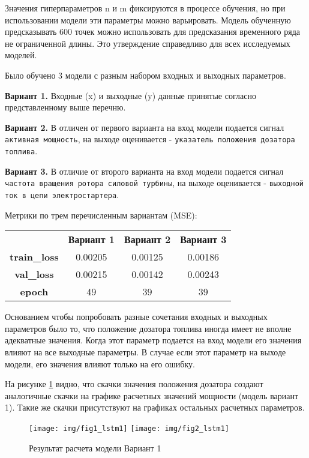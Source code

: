 \documentclass[12pt,a4paper]{article}
\begin{document}
Значения гиперпараметров n и m фиксируются в процессе обучения, но при использовании модели эти параметры можно варьировать. Модель обученную предсказывать 600 точек можно использовать для предсказания временного ряда не ограниченной длины. Это утверждение справедливо для всех исследуемых моделей.

Было обучено 3 модели с разным набором входных и выходных параметров.

{\bf Вариант 1.} Входные (x) и выходные (y) данные принятые согласно представленному выше перечню.

{\bf Вариант 2.} В отличен от первого варианта на вход модели подается сигнал \texttt{активная мощность}, на выходе оценивается - \texttt{указатель положения дозатора топлива}.

{\bf Вариант 3.} В отличие от второго варианта на вход модели подается сигнал \texttt{частота вращения ротора силовой турбины}, на выходе оценивается - \texttt{выходной ток в цепи электростартера}.

Метрики по трем перечисленным вариантам (MSE):

\begin{center}
\begin{tabular}{ |c|c|c|c| } 
	\hline
	 & {\bf Вариант 1} & {\bf Вариант 2} & {\bf Вариант 3} \\ 
	{\bf train\_loss} & 0.00205 & 0.00125 & 0.00186 \\ 
	{\bf val\_loss} & 0.00215 & 0.00142 & 0.00243 \\
	{\bf epoch} & 49 & 39 & 39 \\ 
	\hline
\end{tabular}
\end{center}

Основанием чтобы попробовать разные сочетания входных и выходных параметров было то, что положение дозатора топлива иногда имеет не вполне адекватные значения. Когда этот параметр подается на вход модели его значения влияют на все выходные параметры. В случае если этот параметр на выходе модели, его значения влияют только на его ошибку.

На рисунке \ref{fig:res_lstm1} видно, что скачки значения положения дозатора создают аналогичные скачки на графике расчетных значений мощности (модель вариант 1). Такие же скачки присутствуют на графиках остальных расчетных параметров.

\begin{figure}[htb]
	\centering\texttt{[image: img/fig1\_lstm1]}
	\centering\texttt{[image: img/fig2\_lstm1]}
	\caption{Результат расчета модели Вариант 1}
	\label{fig:res_lstm1}
\end{figure}
\end{document}

